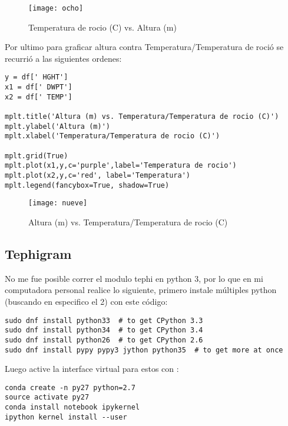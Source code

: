 \documentclass[12pt,letterpaper]{article}
\begin{document}
\begin{figure}[H]
\begin{center}
\texttt{[image: ocho]}
\end{center}
\caption{Temperatura de rocio (C) vs. Altura (m)}
\end{figure}

Por ultimo para graficar altura contra Temperatura/Temperatura de roció se recurrió a las siguientes ordenes:

\begin{verbatim}
y = df[' HGHT']
x1 = df[' DWPT']
x2 = df[' TEMP']

mplt.title('Altura (m) vs. Temperatura/Temperatura de rocio (C)')
mplt.ylabel('Altura (m)')
mplt.xlabel('Temperatura/Temperatura de rocio (C)')

mplt.grid(True)
mplt.plot(x1,y,c='purple',label='Temperatura de rocio')
mplt.plot(x2,y,c='red', label='Temperatura')
mplt.legend(fancybox=True, shadow=True)
\end{verbatim}

\begin{figure}[H]
\begin{center}
\texttt{[image: nueve]}
\end{center}
\caption{Altura (m) vs. Temperatura/Temperatura de rocio (C)}
\end{figure}


\subsection{Tephigram}
No me fue posible correr el modulo tephi en python 3, por lo que en mi computadora personal realice lo siguiente, primero instale múltiples python (buscando en especifico el 2) con este código\cite{b}:

\begin{verbatim}
sudo dnf install python33  # to get CPython 3.3
sudo dnf install python34  # to get CPython 3.4
sudo dnf install python26  # to get CPython 2.6
sudo dnf install pypy pypy3 jython python35  # to get more at once
\end{verbatim}

Luego active la interface virtual para estos con \cite{a}:

\begin{verbatim}
conda create -n py27 python=2.7
source activate py27
conda install notebook ipykernel
ipython kernel install --user
\end{verbatim}
\end{document}
